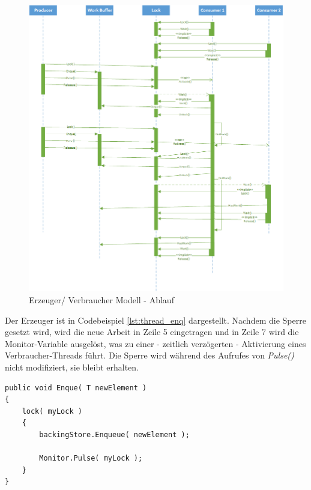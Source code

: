 \begin{figure}
	\centering
	\includegraphics[width=0.9\linewidth]{images/uml-sequence_pulse.png}
	\caption{Erzeuger/ Verbraucher Modell - Ablauf \parencite[S. 405]{posa2} }
	\label{fig:threads_pcs}
\end{figure}

Der Erzeuger ist in Codebeispiel \ref{lst:thread_enq} dargestellt. Nachdem die Sperre gesetzt wird, wird die neue Arbeit in Zeile 5 eingetragen und in Zeile 7 wird die Monitor-Variable ausgelöst, was zu einer - zeitlich verzögerten - Aktivierung eines Verbraucher-Threads führt. Die Sperre wird während des Aufrufes von \textit{Pulse()} nicht modifiziert, sie bleibt erhalten.
\begin{lstlisting}[caption={Thread Monitor.Pulse()},label={lst:thread_enq},captionpos=b]
public void Enque( T newElement )
{
	lock( myLock )
	{
		backingStore.Enqueue( newElement );

		Monitor.Pulse( myLock );
	}
}
\end{lstlisting}
